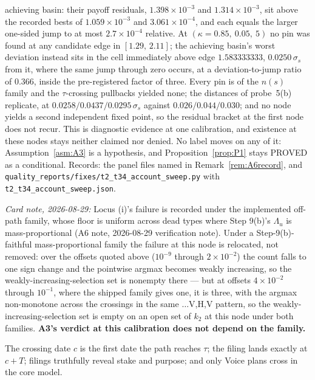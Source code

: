 \begin{remark}
achieving basin: their payoff residuals, $1.398\times10^{-3}$ and $1.314\times10^{-3}$, sit above
the recorded bests of $1.059\times10^{-3}$ and $3.061\times10^{-4}$, and each equals the larger
one-sided jump to at most $2.7\times10^{-4}$ relative. At $(\kappa = 0.85,\ 0.05,\ 5)$ no pin was
found at any candidate edge in $[1.29,\,2.11]$; the achieving basin's worst deviation instead sits
in the cell immediately above edge $1.583333333$, $0.0250\,\sigma_s$ from it, where the same jump
through zero occurs, at a deviation-to-jump ratio of $0.366$, inside the pre-registered factor of
three. Every pin is of the $n(s)$ family and the $\tau$-crossing pullbacks yielded none; the
distances of probe~5(b) replicate, at $0.0258/0.0437/0.0295\,\sigma_s$ against
$0.026/0.044/0.030$; and no node yields a second independent fixed point, so the residual bracket at
the first node does not recur. This is diagnostic evidence at one calibration, and existence at
these nodes stays neither claimed nor denied. No label moves on any of it: Assumption~\ref{asm:A3}
is a hypothesis, and Proposition~\ref{prop:P1} stays PROVED as a conditional. Records: the panel
files named in Remark~\ref{rem:A6record}, and
\texttt{quality\_reports/fixes/t2\_t34\_account\_sweep.py} with
\texttt{t2\_t34\_account\_sweep.json}.

\emph{Card note, 2026-08-29:} Locus (i)'s failure is recorded under the implemented off-path
family, whose floor is uniform across dead types where Step 9(b)'s $\Lambda_u$ is
mass-proportional (A6 note, 2026-08-29 verification note). Under a Step-9(b)-faithful
mass-proportional family the failure at this node is relocated, not removed: over the offsets
quoted above ($10^{-9}$ through $2\times10^{-2}$) the count falls to one sign change and the
pointwise argmax becomes weakly increasing, so the weakly-increasing-selection set is nonempty
there --- but at offsets $4\times10^{-2}$ through $10^{-1}$, where the shipped family gives one,
it is three, with the argmax non-monotone across the crossings in the same $\ldots$V,H,V
pattern, so the weakly-increasing-selection set is empty on an open set of $k_2$ at this node
under both families. \textbf{A3's verdict at this calibration does not depend on the family.}
\end{remark}

\begin{assumption}
\label{asm:A4}
The crossing date $c$ is the first date the path reaches $\tau$; the filing lands exactly at $c+T$;
filings truthfully reveal stake and purpose; and only Voice plans cross in the core model.
\end{assumption}


